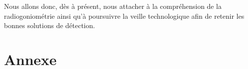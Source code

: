 \documentclass[a4paper, 11pt, oneside]{memoir}
\begin{document}
Nous allons donc, dès à présent, nous attacher à la compréhension de la radiogoniométrie ainsi qu'à poursuivre la veille technologique afin de retenir les bonnes solutions de détection.

\newpage


\part*{Annexe}
\appendix
\nocite{*}



\newpage
\listoffigures
\printindex


\end{document}
